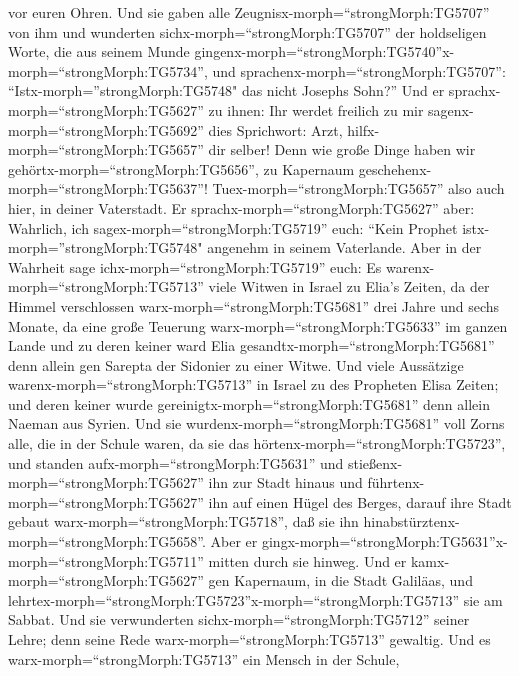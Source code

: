 vor euren Ohren.  Und sie gaben alle
Zeugnisx-morph=``strongMorph:TG5707'' von ihm und wunderten
sichx-morph=``strongMorph:TG5707'' der holdseligen Worte, die aus seinem
Munde
gingenx-morph=``strongMorph:TG5740''\textbar x-morph=``strongMorph:TG5734'',
und sprachenx-morph=``strongMorph:TG5707'':
``Istx-morph=''strongMorph:TG5748" das nicht Josephs Sohn?''
 Und er sprachx-morph=``strongMorph:TG5627'' zu ihnen: Ihr
werdet freilich zu mir sagenx-morph=``strongMorph:TG5692'' dies
Sprichwort: Arzt, hilfx-morph=``strongMorph:TG5657'' dir selber! Denn
wie große Dinge haben wir gehörtx-morph=``strongMorph:TG5656'', zu
Kapernaum geschehenx-morph=``strongMorph:TG5637''!
Tuex-morph=``strongMorph:TG5657'' also auch hier, in deiner Vaterstadt.
 Er sprachx-morph=``strongMorph:TG5627'' aber: Wahrlich,
ich sagex-morph=``strongMorph:TG5719'' euch: ``Kein Prophet
istx-morph=''strongMorph:TG5748" angenehm in seinem Vaterlande.
 Aber in der Wahrheit sage
ichx-morph=``strongMorph:TG5719'' euch: Es
warenx-morph=``strongMorph:TG5713'' viele Witwen in Israel zu Elia's
Zeiten, da der Himmel verschlossen warx-morph=``strongMorph:TG5681''
drei Jahre und sechs Monate, da eine große Teuerung
warx-morph=``strongMorph:TG5633'' im ganzen Lande  und zu
deren keiner ward Elia gesandtx-morph=``strongMorph:TG5681'' denn allein
gen Sarepta der Sidonier zu einer Witwe.  Und viele
Aussätzige warenx-morph=``strongMorph:TG5713'' in Israel zu des
Propheten Elisa Zeiten; und deren keiner wurde
gereinigtx-morph=``strongMorph:TG5681'' denn allein Naeman aus Syrien.
 Und sie wurdenx-morph=``strongMorph:TG5681'' voll Zorns
alle, die in der Schule waren, da sie das
hörtenx-morph=``strongMorph:TG5723'',  und standen
aufx-morph=``strongMorph:TG5631'' und
stießenx-morph=``strongMorph:TG5627'' ihn zur Stadt hinaus und
führtenx-morph=``strongMorph:TG5627'' ihn auf einen Hügel des Berges,
darauf ihre Stadt gebaut warx-morph=``strongMorph:TG5718'', daß sie ihn
hinabstürztenx-morph=``strongMorph:TG5658''.  Aber er
gingx-morph=``strongMorph:TG5631''x-morph=``strongMorph:TG5711'' mitten
durch sie hinweg.  Und er kamx-morph=``strongMorph:TG5627''
gen Kapernaum, in die Stadt Galiläas, und
lehrtex-morph=``strongMorph:TG5723''x-morph=``strongMorph:TG5713'' sie
am Sabbat.  Und sie verwunderten
sichx-morph=``strongMorph:TG5712'' seiner Lehre; denn seine Rede
warx-morph=``strongMorph:TG5713'' gewaltig.  Und es
warx-morph=``strongMorph:TG5713'' ein Mensch in der Schule,
